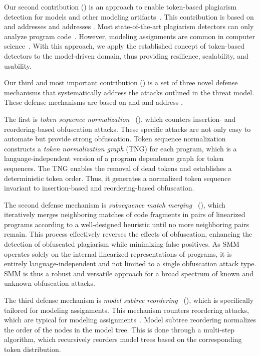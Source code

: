 Our second contribution () is an approach to enable token-based plagiarism detection for models and other modeling artifacts~\cite{Saglam2024a}.
This contribution is based on  and addresses and addresses .
Most state-of-the-art plagiarism detectors can only analyze program code~\cite{Martinez2020, Saglam2022, Saglam2023}.
However, modeling assignments are common in computer science~\cite{Ciccozzi2018, Saglam2023}.
With this approach, we apply the established concept of token-based detectors to the model-driven domain, thus providing resilience, scalability, and usability.

Our third and most important contribution () is a set of three novel defense mechanisms that systematically address the attacks outlined in the threat model. These defense mechanisms are based on  and  and address .

The first is \textit{token sequence normalization}~\cite{Saglam2024b} (), which counters insertion- and reordering-based obfuscation attacks. These specific attacks are not only easy to automate but provide strong obfuscation.
Token sequence normalization constructs a \textit{token normalization graph} (TNG) for each program, which is a language-independent version of a program dependence graph for token sequences. The TNG enables the removal of dead tokens and establishes a deterministic token order. Thus, it generates a normalized token sequence invariant to insertion-based and reordering-based obfuscation.

The second defense mechanism is \textit{subsequence match merging}~\cite{Saglam2024c} (), which iteratively merges neighboring matches of code fragments in pairs of linearized programs according to a well-designed heuristic until no more neighboring pairs remain. This process effectively reverses the effects of obfuscation, enhancing the detection of obfuscated plagiarism while minimizing false positives.
As SMM operates solely on the internal linearized representations of programs, it is entirely language-independent and not limited to a single obfuscation attack type.
SMM is thus a robust and versatile approach for a broad spectrum of known and unknown obfuscation attacks.

The third defense mechanism is \textit{model subtree reordering}~\cite{Saglam2024a} (), which is specifically tailored for modeling assignments.
This mechanism counters reordering attacks, which are typical for modeling assignments~\cite{Saglam2023}.
Model subtree reordering normalizes the order of the nodes in the model tree. This is done through a multi-step algorithm, which recursively reorders model trees based on the corresponding token distribution.

